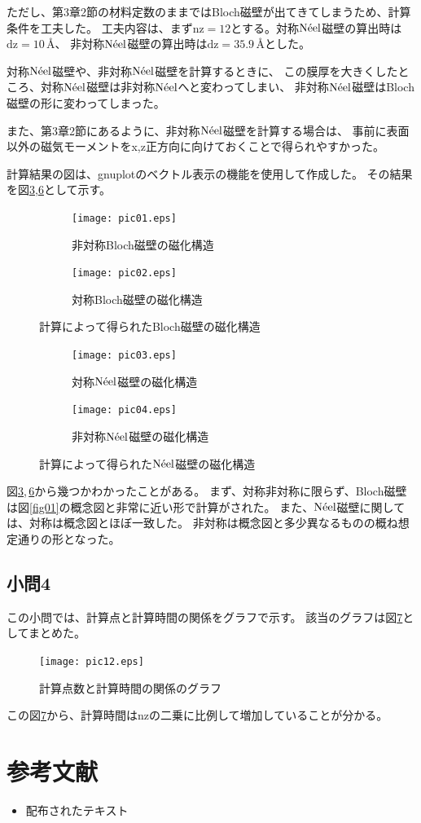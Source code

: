 \documentclass{jsarticle}
\begin{document}
ただし、第3章2節の材料定数のままではBloch磁壁が出てきてしまうため、計算条件を工夫した。
工夫内容は、まず$\mathrm{nz}=12$とする。対称$\mathrm{N\Acute{e}el}$磁壁の算出時は$\mathrm{dz} = 10$\,\AA、
非対称$\mathrm{N\Acute{e}el}$磁壁の算出時は$\mathrm{dz} = 35.9$\,\AA とした。

対称$\mathrm{N\Acute{e}el}$磁壁や、非対称$\mathrm{N\Acute{e}el}$磁壁を計算するときに、
この膜厚を大きくしたところ、対称$\mathrm{N\Acute{e}el}$磁壁は非対称$\mathrm{N\Acute{e}el}$へと変わってしまい、
非対称$\mathrm{N\Acute{e}el}$磁壁はBloch磁壁の形に変わってしまった。

また、第3章2節にあるように、非対称$\mathrm{N\Acute{e}el}$磁壁を計算する場合は、
事前に表面以外の磁気モーメントをx,z正方向に向けておくことで得られやすかった。

計算結果の図は、gnuplotのベクトル表示の機能を使用して作成した。
その結果を図\ref{fig06},\ref{fig04}として示す。
\begin{figure}[H]
	\centering
	\begin{subfigure}{0.8\columnwidth}
		\centering
		\texttt{[image: pic01.eps]}
		\caption{非対称Bloch磁壁の磁化構造}
		\label{fig04_1}
	\end{subfigure}
	\begin{subfigure}{0.8\columnwidth}
		\centering
		\texttt{[image: pic02.eps]}
		\caption{対称Bloch磁壁の磁化構造}
		\label{fig04_2}
	\end{subfigure}
	\caption{計算によって得られたBloch磁壁の磁化構造}
	\label{fig06}
\end{figure}

\begin{figure}[H]
	\centering
	\begin{subfigure}{0.8\columnwidth}
		\centering
		\texttt{[image: pic03.eps]}
		\caption{対称$\mathrm{N\Acute{e}el}$磁壁の磁化構造}
		\label{fig04_3}
	\end{subfigure}
	\begin{subfigure}{0.8\columnwidth}
		\centering
		\texttt{[image: pic04.eps]}
		\caption{非対称$\mathrm{N\Acute{e}el}$磁壁の磁化構造}
		\label{fig04_4}
	\end{subfigure}
	\caption{計算によって得られた$\mathrm{N\Acute{e}el}$磁壁の磁化構造}
	\label{fig04}
\end{figure}

図\ref{fig06},\,\ref{fig04}から幾つかわかったことがある。
まず、対称非対称に限らず、Bloch磁壁は図\ref{fig01}の概念図と非常に近い形で計算がされた。
また、$\mathrm{N\Acute{e}el}$磁壁に関しては、対称は概念図とほぼ一致した。
非対称は概念図と多少異なるものの概ね想定通りの形となった。

\subsection{小問4}
この小問では、計算点と計算時間の関係をグラフで示す。
該当のグラフは図\ref{fig05}としてまとめた。
\begin{figure}[H]
	\centering
	\texttt{[image: pic12.eps]}
	\caption{計算点数と計算時間の関係のグラフ}
	\label{fig05}
\end{figure}

この図\ref{fig05}から、計算時間はnzの二乗に比例して増加していることが分かる。


\section{参考文献}
\begin{itemize}
  \item 配布されたテキスト
\end{itemize}
\end{document}
